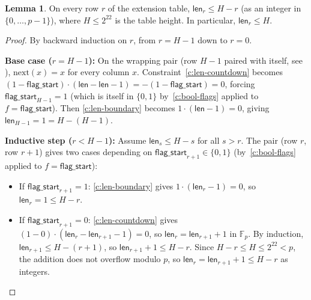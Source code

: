 \documentclass{article}
\theoremstyle{definition}
\newcommand{\Fp}{\mathbb F_p}
\newtheorem{lemma}{Lemma}
\begin{document}
\vspace{5mm}

\begin{lemma}\label{lem:len-bound}
On every row $r$ of the extension table, $\textsf{len}_r \leq H - r$ (as an integer in $\{0, \dots, p-1\}$), where $H \leq 2^{22}$ is the table height. In particular, $\textsf{len}_r \leq H$.
\end{lemma}

\begin{proof}
By backward induction on $r$, from $r = H - 1$ down to $r = 0$.

\vspace{2mm}

\textbf{Base case ($r = H - 1$):} On the wrapping pair (row $H\!-\!1$ paired with itself, see ), $\text{next}(x) = x$ for every column $x$. Constraint~\eqref{c:len-countdown} becomes $(1 - \textsf{flag\_start}) \cdot (\textsf{len} - \textsf{len} - 1) = -(1 - \textsf{flag\_start}) = 0$, forcing $\textsf{flag\_start}_{H-1} = 1$ (which is itself in $\{0, 1\}$ by~\eqref{c:bool-flags} applied to $f = \textsf{flag\_start}$). Then \eqref{c:len-boundary} becomes $1 \cdot (\textsf{len} - 1) = 0$, giving $\textsf{len}_{H-1} = 1 = H - (H-1)$.

\vspace{2mm}

\textbf{Inductive step ($r < H - 1$):} Assume $\textsf{len}_s \leq H - s$ for all $s > r$. The pair (row $r$, row $r\!+\!1$) gives two cases depending on $\textsf{flag\_start}_{r+1} \in \{0,1\}$ (by~\eqref{c:bool-flags} applied to $f = \textsf{flag\_start}$):

\begin{itemize}
    \item If $\textsf{flag\_start}_{r+1} = 1$: \eqref{c:len-boundary} gives $1 \cdot (\textsf{len}_r - 1) = 0$, so $\textsf{len}_r = 1 \leq H - r$.
    \item If $\textsf{flag\_start}_{r+1} = 0$: \eqref{c:len-countdown} gives $(1 - 0) \cdot (\textsf{len}_r - \textsf{len}_{r+1} - 1) = 0$, so $\textsf{len}_r = \textsf{len}_{r+1} + 1$ in $\Fp$. By induction, $\textsf{len}_{r+1} \leq H - (r+1)$, so $\textsf{len}_{r+1} + 1 \leq H - r$. Since $H - r \leq H \leq 2^{22} < p$, the addition does not overflow modulo $p$, so $\textsf{len}_r = \textsf{len}_{r+1} + 1 \leq H - r$ as integers.
\end{itemize}
\end{proof}

\vspace{3mm}
\end{document}
